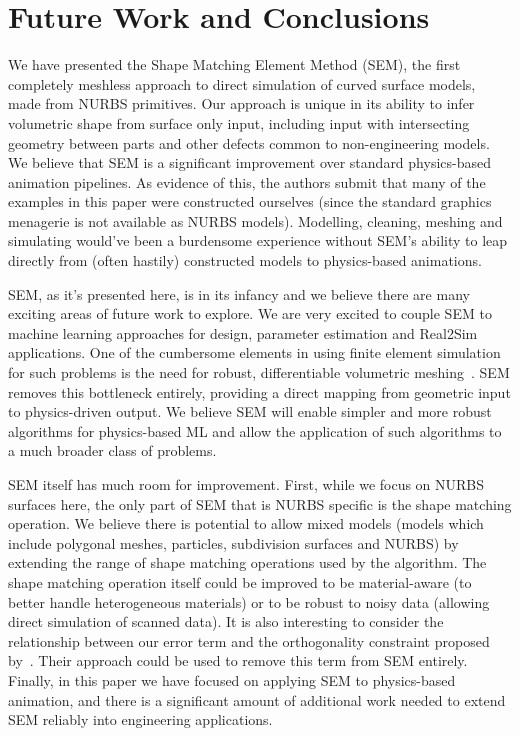 \section{Future Work and Conclusions}
We have presented the Shape Matching Element Method (SEM), the first completely meshless approach to direct simulation of curved surface models, made from NURBS primitives.
Our approach is unique in its ability to infer volumetric shape from surface only input,
including input with intersecting geometry between parts and other defects common to non-engineering models.
We believe that SEM is a significant improvement over standard physics-based animation pipelines. 
As evidence of this, the authors submit that many of the examples in this paper were constructed ourselves
(since the standard graphics menagerie is not available as NURBS models). 
Modelling, cleaning, meshing and simulating would've been a burdensome experience without SEM's
ability to leap directly from (often hastily) constructed models to physics-based animations.

SEM, as it's presented here, is in its infancy and we believe there are many exciting areas of future work to explore.
We are very excited to couple SEM to machine learning approaches for design, parameter estimation and Real2Sim applications.
One of the cumbersome elements in using finite element simulation for such problems is the need for robust, differentiable volumetric meshing~\cite{gao2020deftet}.
SEM removes this bottleneck entirely, providing a direct mapping from geometric input to physics-driven output. 
We believe SEM will enable simpler and more robust algorithms for  physics-based ML and 
allow the application of such algorithms to a much broader class of problems. 

SEM itself has much room for improvement. 
First, while we focus on NURBS surfaces here, the only part of SEM that is NURBS specific is the shape matching operation.
We believe there is potential to allow mixed models (models which include polygonal meshes, particles, subdivision surfaces and NURBS)
by extending the range of shape matching operations used by the algorithm. The shape matching operation itself could be improved to be material-aware 
(to better handle heterogeneous materials) or to be robust to noisy data (allowing direct simulation of scanned data).
 
It is also interesting to consider the relationship between our error term and the orthogonality constraint proposed by~\citet{Zhang:CompDynamics:2020}. 
Their approach could be used to remove this term from SEM entirely.
Finally, in this paper we have focused on applying SEM to physics-based animation, and there is a significant amount of additional work needed to 
extend SEM reliably into engineering applications.

